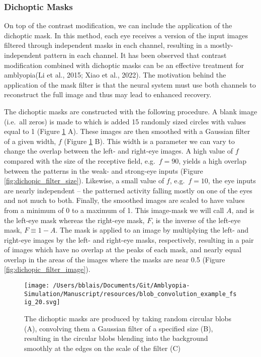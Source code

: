 \documentclass[
  onecolumn]{article}
\begin{document}
\hypertarget{dichoptic-masks}{%
\subsubsection{Dichoptic Masks}\label{dichoptic-masks}}

On top of the contrast modification, we can include the application of
the dichoptic mask. In this method, each eye receives a version of the
input images filtered through independent masks in each channel,
resulting in a mostly-independent pattern in each channel. It has been
observed that contrast modification combined with dichoptic masks can be
an effective treatment for amblyopia(Li et al., 2015; Xiao et al.,
2022). The motivation behind the application of the mask filter is that
the neural system must use both channels to reconstruct the full image
and thus may lead to enhanced recovery.

The dichoptic masks are constructed with the following procedure. A
blank image (i.e.~all zeros) is made to which is added 15 randomly sized
circles with values equal to 1 (Figure \ref{fig:dichopic_blob} A). These
images are then smoothed with a Gaussian filter of a given width, \(f\)
(Figure \ref{fig:dichopic_blob} B). This width is a parameter we can
vary to change the overlap between the left- and right-eye images. A
high value of \(f\) compared with the size of the receptive field,
e.g.~\(f=90\), yields a high overlap between the patterns in the weak-
and strong-eye inputs (Figure \ref{fig:dichopic_filter_size}). Likewise,
a small value of \(f\), e.g.~\(f=10\), the eye inputs are nearly
independent -- the patterned activity falling mostly on one of the eyes
and not much to both. Finally, the smoothed images are scaled to have
values from a minimum of 0 to a maximum of 1. This image-mask we will
call \(A\), and is the left-eye mask whereas the right-eye mask, \(F\),
is the inverse of the left-eye mask, \(F\equiv 1-A\). The mask is
applied to an image by multiplying the left- and right-eye images by the
left- and right-eye masks, respectively, resulting in a pair of images
which have no overlap at the peaks of each mask, and nearly equal
overlap in the areas of the images where the masks are near 0.5 (Figure
\ref{fig:dichopic_filter_image}).

\begin{figure}
\hypertarget{fig:dichopic_blob}{%
\centering
\texttt{[image: /Users/bblais/Documents/Git/Amblyopia-Simulation/Manuscript/resources/blob\_convolution\_example\_fsig\_20.svg]}
\caption{The dichoptic masks are produced by taking random circular
blobs (A), convolving them a Gaussian filter of a specified size (B),
resulting in the circular blobs blending into the background smoothly at
the edges on the scale of the filter (C)}\label{fig:dichopic_blob}
}
\end{figure}
\end{document}
